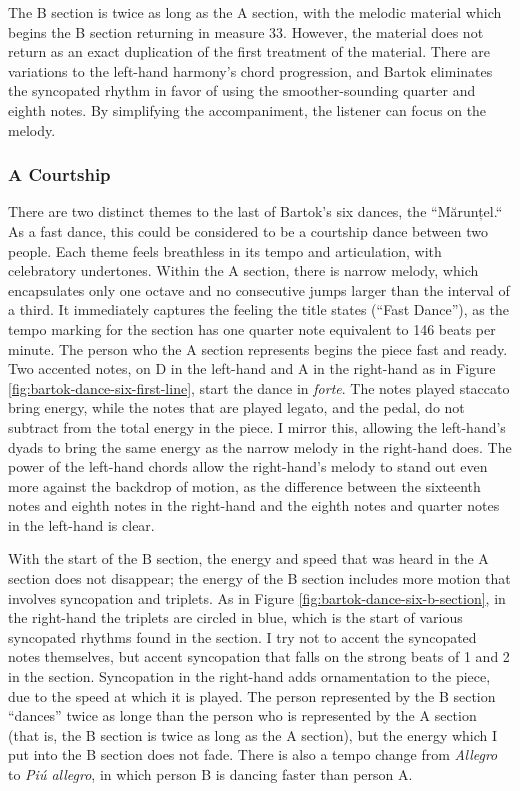 The B section is twice as long as the A section, with the melodic material which begins the B section returning in measure 33. However, the material does not return as an exact duplication of the first treatment of the material. There are variations to the left-hand harmony's chord progression, and Bartok eliminates the syncopated rhythm in favor of using the smoother-sounding quarter and eighth notes. By simplifying the accompaniment, the listener can focus on the melody.

\subsubsection{A Courtship}

There are two distinct themes to the last of Bartok's six dances, the ``Mărunțel.`` As a fast dance, this could be considered to be a courtship dance between two people. Each theme feels breathless in its tempo and articulation, with celebratory undertones. Within the A section, there is narrow melody, which encapsulates only one octave and no consecutive jumps larger than the interval of a third. It immediately captures the feeling the title states (``Fast Dance''), as the tempo marking for the section has one quarter note equivalent to 146 beats per minute. The person who the A section represents begins the piece fast and ready. Two accented notes, on D in the left-hand and A in the right-hand as in Figure \ref{fig:bartok-dance-six-first-line}\autocite{Lung_2016}, start the dance in \textit{forte}. The notes played staccato bring energy, while the notes that are played legato, and the pedal, do not subtract from the total energy in the piece. I mirror this, allowing the left-hand's dyads to bring the same energy as the narrow melody in the right-hand does. The power of the left-hand chords allow the right-hand's melody to stand out even more against the backdrop of motion, as the difference between the sixteenth notes and eighth notes in the right-hand and the eighth notes and quarter notes in the left-hand is clear. 

With the start of the B section, the energy and speed that was heard in the A section does not disappear; the energy of the B section includes more motion that involves syncopation and triplets. As in Figure \ref{fig:bartok-dance-six-b-section}\autocite{Lung_2016}, in the right-hand the triplets are circled in blue, which is the start of various syncopated rhythms found in the section. I try not to accent the syncopated notes themselves, but accent syncopation that falls on the strong beats of 1 and 2 in the section. Syncopation in the right-hand adds ornamentation to the piece, due to the speed at which it is played. The person represented by the B section ``dances'' twice as longe than the person who is represented by the A section (that is, the B section is twice as long as the A section), but the energy which I put into the B section does not fade. There is also a tempo change from \textit{Allegro} to \textit{Piú allegro}, in which person B is dancing faster than person A.